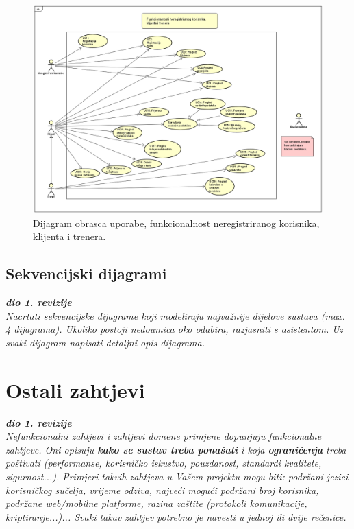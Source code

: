 		\begin{figure}[H]
			\includegraphics[scale=0.8]{slike/UC_client_trainer_unregistered.PNG} %
			\caption{Dijagram obrasca uporabe, funkcionalnost neregistriranog korisnika, klijenta i trenera.}
			\label{fig:UC_klijent_trener_neregistrirani} %
		\end{figure}
		
		
				
			\subsection{Sekvencijski dijagrami}
				
				\textbf{\textit{dio 1. revizije}}\\
				
				\textit{Nacrtati sekvencijske dijagrame koji modeliraju najvažnije dijelove sustava (max. 4 dijagrama). Ukoliko postoji nedoumica oko odabira, razjasniti s asistentom. Uz svaki dijagram napisati detaljni opis dijagrama.}
				\eject
	
		\section{Ostali zahtjevi}
		
			\textbf{\textit{dio 1. revizije}}\\
		 
			 \textit{Nefunkcionalni zahtjevi i zahtjevi domene primjene dopunjuju funkcionalne zahtjeve. Oni opisuju \textbf{kako se sustav treba ponašati} i koja \textbf{ograničenja} treba poštivati (performanse, korisničko iskustvo, pouzdanost, standardi kvalitete, sigurnost...). Primjeri takvih zahtjeva u Vašem projektu mogu biti: podržani jezici korisničkog sučelja, vrijeme odziva, najveći mogući podržani broj korisnika, podržane web/mobilne platforme, razina zaštite (protokoli komunikacije, kriptiranje...)... Svaki takav zahtjev potrebno je navesti u jednoj ili dvije rečenice.}
			 
			 
			 
	